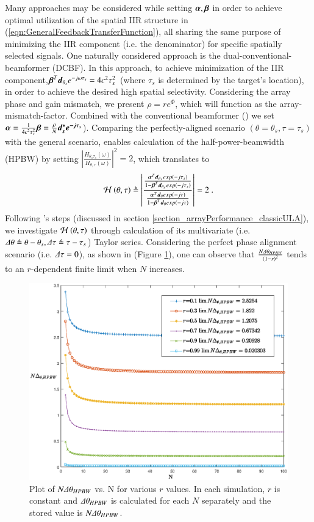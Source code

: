 Many approaches may be considered while setting $\boldsymbol{\alpha},\boldsymbol{\beta}$ in order to achieve optimal utilization of the spatial IIR structure in (\ref{eqn:GeneralFeedbackTransferFunction}), all sharing the same purpose of minimizing the IIR component (i.e. the denominator) for specific spatially selected signals.
One naturally considered approach is the dual-conventional-beamformer (DCBF). In this approach, to achieve minimization of the IIR component,$ \boldsymbol{\beta}^{T}\boldsymbol{d}_{\theta_{s}}e^{-j\omega\tau_{s}} = 4c^{2}\tau_{s}^{2} $ (where $\tau_{s}$ is determined by the target's location), in order to achieve the desired high spatial selectivity. Considering the array phase and gain mismatch, we present $\rho = re^{\Phi}$, which will function as the array-mismatch-factor. Combined with the conventional beamformer (\cite{VanTrees2002DetectionIV}) we set $ \boldsymbol{\alpha} = \frac{1}{4c^{2}\tau_{s}^{2}}\boldsymbol{\beta} = \frac{\rho}{N}\boldsymbol{d^{*}_{s}e^{-j\tau_{s}}} $). Comparing the perfectly-aligned scenario $\left(\theta = \theta_{s}, \tau = \tau_{s}\right)$ with the general scenario, enables calculation of the half-power-beamwidth (HPBW) by setting $\left|\frac{H_{\theta_{s}\tau_{s}}\left(\omega{}\right)}{H_{\theta,\tau}\left(\omega{}\right)}\right|^{2} = 2$, which translates to 
\begin{align}
\label{eqn_arrPerformance_beamwidth_3dB}
\Hr{\theta}{\tau}{}
\triangleq
\fbBpRatio
=
2\ .
\end{align}
\ifdefined\DEFIncludeAttenuation
    Following \cite{VanTrees2002DetectionIV}'s steps (discussed in section \ref{section_arrayPerformance_classicULA}), we investigate $\mathcal{H}^{}\left(\theta,\tau\right)$ through calculation of its multivariate (i.e. $\Delta\theta\triangleq\theta-\theta_{s}, \Delta\tau\triangleq\tau-\tau_{s}$) Taylor series. Considering the perfect phase alignment scenario (i.e. $\Delta\tau=0$), as shown in (Figure \ref{fig_feedbackULA_beamwidth_Nx_HPBW_1_r_2}), one can observe that $\frac{N\Delta\theta_{HPBW}}{\left(1-r\right)^{2}}$ tends to an $r$-dependent finite limit when $N$ increases. 
    \begin{figure}
        \label{fig_feedbackULA_beamwidth_Nx_HPBW_1_r_2}
        \centering
        \includegraphics[width=0.8\linewidth]{./Media/spatial_IIR_MATLAB/beamwidth/HPBW_vs_N_various_r.eps}
        \caption{Plot of $N\Delta\theta_{HPBW}$ vs. N for various $r$ values. In each simulation, $r$ is constant and $\Delta\theta_{HPBW}$ is calculated for each $N$ separately and the stored value is $N\Delta\theta_{HPBW}$.}
    \end{figure}
